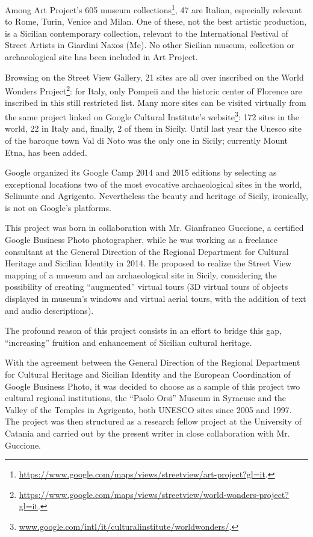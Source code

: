 \documentclass[amsthm,ebook]{saparticle}
\begin{document}
Among Art Project’s 605 museum collections\footnote{\url{https://www.google.com/maps/views/streetview/art-project?gl=it}.}, 47
are Italian, especially relevant to Rome, Turin, Venice and Milan. One of these, not the best artistic production, is a
Sicilian contemporary collection, relevant to the International Festival of Street Artists in Giardini Naxos (Me). No
other Sicilian museum, collection or archaeological site has been included in Art Project.

Browsing on the Street View Gallery, 21 sites are all over inscribed on the World Wonders
Project\footnote{\url{https://www.google.com/maps/views/streetview/world-wonders-project?gl=it}.}: for Italy, only Pompeii
and the historic center of Florence are inscribed in this still restricted list. Many more sites can be visited
virtually from the same project linked on Google Cultural Institute’s
website\footnote{\url{www.google.com/intl/it/culturalinstitute/worldwonders/}. }: 172 sites in the world, 22 in Italy and,
finally, 2 of them in Sicily. Until last year the Unesco site of the baroque town Val di Noto was the only one in
Sicily; currently Mount Etna, has been added. 

Google organized its Google Camp 2014 and 2015 editions by selecting as exceptional locations two of the most evocative
archaeological sites in the world, Selinunte and Agrigento. Nevertheless the beauty and heritage of Sicily, ironically,
is not on Google’s platforms.

This project was born in collaboration with Mr. Gianfranco Guccione, a certified Google Business Photo photographer,
while he was working as a freelance consultant at the General Direction of the Regional Department for Cultural
Heritage and Sicilian Identity in 2014. He proposed to realize the Street View mapping of a museum and an
archaeological site in Sicily, considering the possibility of creating ``augmented'' virtual tours (3D virtual tours of
objects displayed in museum’s windows and virtual aerial tours, with the addition of text and audio descriptions). 

The profound reason of this project consists in an effort to bridge this gap, ``increasing'' fruition and enhancement of
Sicilian cultural heritage. 

With the agreement between the General Direction of the Regional Department for Cultural Heritage and Sicilian Identity
and the European Coordination of Google Business Photo, it was decided to choose as a sample of this project two
cultural regional institutions, the ``Paolo Orsi'' Museum in Syracuse and the Valley of the Temples in Agrigento, both
UNESCO sites since 2005 and 1997. The project was then structured as a research fellow project at the University of
Catania and carried out by the present writer in close collaboration with Mr. Guccione. 
\end{document}
